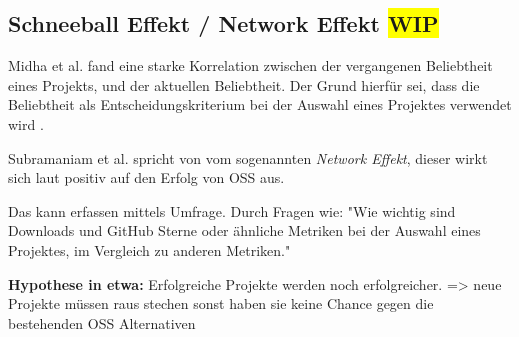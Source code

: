 \subsection{Schneeball Effekt / Network Effekt \colorbox{yellow}{WIP}}


\bigskip
\noindent
Midha et al. fand eine starke Korrelation zwischen der vergangenen Beliebtheit eines Projekts,
und der aktuellen Beliebtheit. Der Grund hierfür sei, dass die Beliebtheit
als Entscheidungskriterium bei der Auswahl eines Projektes verwendet wird 
\cite{midhaFactorsAffectingSuccess2012}. %

Subramaniam et al. spricht von vom sogenannten \textit{Network Effekt},
dieser wirkt sich laut \cite{subramaniamDeterminantsOpenSource2009} %
positiv auf den Erfolg von OSS aus.


Das kann erfassen mittels Umfrage. Durch Fragen wie: "Wie wichtig sind Downloads und GitHub 
Sterne oder ähnliche Metriken bei der Auswahl eines Projektes, im Vergleich zu anderen Metriken."


\bigskip
\noindent
\textbf{Hypothese in etwa:} Erfolgreiche Projekte werden noch erfolgreicher. => neue Projekte müssen raus stechen
sonst haben sie keine Chance gegen die bestehenden OSS Alternativen



